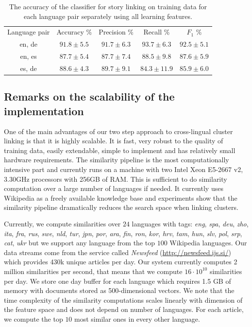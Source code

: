 \begin{table}[t]
\begin{center}
\begin{tabular}{|c|c|c|c|c|}
  \hline
  \cline{1-5}
  Language pair & Accuracy \% & Precision \% & Recall \% & $F_1$ \% \\ \cline{1-5}
  en, de & $91.8 \pm 5.5$ & $91.7 \pm  6.3$ & $93.7 \pm  6.3$ & $92.5 \pm  5.1$ \\ \cline{1-5}
  en, es & $87.7 \pm 5.4$ & $87.7 \pm  7.4$ & $88.5 \pm  9.8$ & $87.6 \pm  5.9$ \\ \cline{1-5}
  es, de & $88.6 \pm 4.3$ & $89.7 \pm  9.1$ & $84.3 \pm 11.9$ & $85.9 \pm  6.0$ \\ \cline{1-5}
  \hline
\end{tabular}
\end{center}
\caption{The accuracy of the classifier for story linking on training data for each language pair separately using all learning features.}
\label{table:langPairEval}
\end{table}

\subsection{Remarks on the scalability of the implementation}

One of the main advantages of our two step approach to cross-lingual cluster linking is that it is highly scalable. 
It is fast, very robust to the quality of training data, easily extendable, simple to implement 
and has relatively small hardware requirements. The similarity pipeline is the most computationally 
intensive part and currently runs on a machine with two Intel Xeon E5-2667 v2, 3.30GHz processors 
with 256GB of RAM. This is sufficient to do similarity computation over a large number of 
languages if needed. It currently uses Wikipedia as a freely available knowledge base 
and experiments show that the similarity pipeline dramatically reduces the search space when linking clusters.

Currently, we compute similarities over $24$ languages with 
tags: \emph{eng}, \emph{spa}, \emph{deu}, \emph{zho}, \emph{ita}, \emph{fra}, \emph{rus}, 
\emph{swe}, \emph{nld}, \emph{tur}, \emph{jpn}, \emph{por}, \emph{ara}, \emph{fin}, 
\emph{ron}, \emph{kor}, \emph{hrv}, \emph{tam}, \emph{hun}, \emph{slv}, \emph{pol}, 
\emph{srp}, \emph{cat}, \emph{ukr} but we support any language from the top $100$ Wikipedia languages. 
Our data streams come from the service called \emph{Newsfeed} (\url{http://newsfeed.ijs.si/}) 
which provides 430k unique articles per day. 
Our system currently computes 2 million similarities per second, that means that we 
compute $16 \cdot 10^{10}$ similarities per day. We
store one day buffer for each language which requires 1.5 GB of memory with documents 
stored as 500-dimensional vectors. We note that the time complexity of the similarity 
computations scales linearly with dimension of the feature space and does not 
depend on number of languages. For each article, we compute the top $10$ most 
similar ones in every other language.

